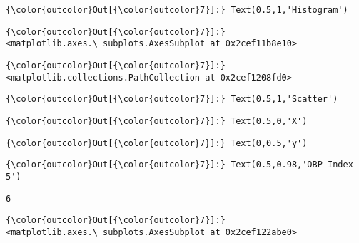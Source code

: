 \documentclass[11pt]{article}
\begin{document}
\begin{Verbatim}[commandchars=\\\{\}]
{\color{outcolor}Out[{\color{outcolor}7}]:} Text(0.5,1,'Histogram')
\end{Verbatim}
            
\begin{Verbatim}[commandchars=\\\{\}]
{\color{outcolor}Out[{\color{outcolor}7}]:} <matplotlib.axes.\_subplots.AxesSubplot at 0x2cef11b8e10>
\end{Verbatim}
            
\begin{Verbatim}[commandchars=\\\{\}]
{\color{outcolor}Out[{\color{outcolor}7}]:} <matplotlib.collections.PathCollection at 0x2cef1208fd0>
\end{Verbatim}
            
\begin{Verbatim}[commandchars=\\\{\}]
{\color{outcolor}Out[{\color{outcolor}7}]:} Text(0.5,1,'Scatter')
\end{Verbatim}
            
\begin{Verbatim}[commandchars=\\\{\}]
{\color{outcolor}Out[{\color{outcolor}7}]:} Text(0.5,0,'X')
\end{Verbatim}
            
\begin{Verbatim}[commandchars=\\\{\}]
{\color{outcolor}Out[{\color{outcolor}7}]:} Text(0,0.5,'y')
\end{Verbatim}
            
\begin{Verbatim}[commandchars=\\\{\}]
{\color{outcolor}Out[{\color{outcolor}7}]:} Text(0.5,0.98,'OBP Index 5')
\end{Verbatim}
            
    \begin{Verbatim}[commandchars=\\\{\}]
6

    \end{Verbatim}

\begin{Verbatim}[commandchars=\\\{\}]
{\color{outcolor}Out[{\color{outcolor}7}]:} <matplotlib.axes.\_subplots.AxesSubplot at 0x2cef122abe0>
\end{Verbatim}
            
\end{document}
